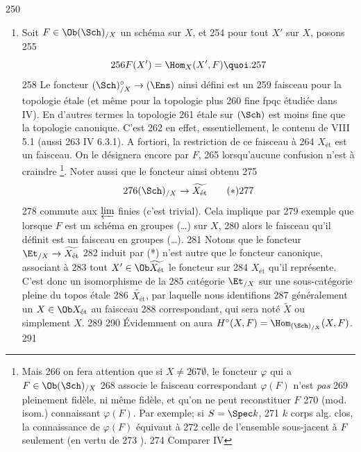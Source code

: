    250	\begin{enumerate}
   251	\renewcommand{\theenumi}{\alph{enumi}}
   252	\renewcommand{\labelenumi}{\theenumi)}
   253	\item Soit $F \in \Ob (\Sch)_{/X}$ un schéma sur $X$, et
   254	  pour tout $X'$ sur $X$, posons
   255	$$
   256	F(X') = \Hom_X (X', F){\quoi}.
   257	$$
   258	Le foncteur $(\Sch)^{\circ}_{/X} \to (\Ens)$ ainsi défini est un
   259	faisceau pour la topologie étale (et même pour la topologie plus
   260	fine fpqc étudiée dans  IV). En d'autres termes la topologie
   261	étale sur $(\Sch)$ est moins fine que la topologie canonique. C'est
   262	en effet, essentiellement, le contenu de  VIII 5.1 (\cf aussi
   263	 IV 6.3.1). A fortiori, la restriction de ce faisceau à
   264	$X_{\text{ét}}$ est un faisceau. On le désignera encore par $F$,
   265	lorsqu'aucune confusion n'est à craindre \footnote{Mais
   266	on fera attention que si $X \neq
   267	  ∅$, le foncteur $\varphi$ qui a $F \in \Ob (\Sch)_{/X}$
   268	  associe le faisceau correspondant $\varphi(F)$ n'est \emph{pas}
   269	  pleinement fidèle, ni même fidèle, et qu'on ne peut reconstituer $F$
   270	(mod. isom.) connaissant $\varphi(F)$. Par exemple; si $S = \Spec k$,
   271	  $k$ corps alg. clos, la connaissance de $\varphi(F)$ équivaut à
   272	  celle de l'ensemble sous-jacent à $F$ seulement (en vertu de
   273	  ).
   274	Comparer IV}. Noter aussi que le foncteur ainsi obtenu
   275	\begin{equation*}
   276	(\Sch)_{/X} \to \widetilde{X_{\text{ét}}}\tag{$\ast$}
   277	\end{equation*}
   278	commute aux $\varprojlim$ finies (c'est trivial). Cela implique par
   279	exemple que lorsque $F$ est un schéma en groupes (\resp\ldots) sur $X$,
   280	alors le faisceau qu'il définit est un faisceau en groupes (\resp\ldots).
   281	 Notons que le foncteur $\Et_{/X} \to \widetilde{X_{\text{ét}}}$
   282	induit par (*) n'est autre que le foncteur canonique, associant à
   283	tout $X'\in \Ob \widetilde{X_{\text{ét}}}$ le foncteur sur
   284	$X_{\text{ét}}$ qu'il représente. C'est donc un isomorphisme de la
   285	catégorie $\Et_{/X}$ sur une sous-catégorie pleine du topos étale
   286	$\widetilde{X_{\text{ét}}}$, par laquelle nous identifions
   287	généralement un $X \in \Ob X_{\text{ét}}$  au faisceau
   288	correspondant, qui sera noté $\widetilde{X}$ ou simplement $X$.
   289	
   290	Évidemment on aura $H^{\circ}(X, F) = \Hom_{(\Sch)_{/X}} (X, F)$.
   291	

\end{enumerate}
